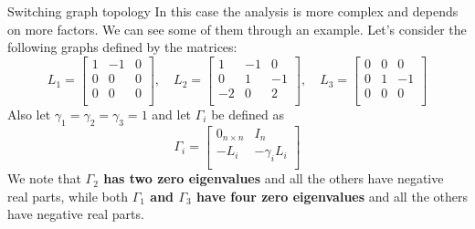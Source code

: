 \begin{frame}{Switching graph topology}
\vskip 0.9cm
In this case the analysis is more complex and depends on more factors.
We can see some of them through an example.
Let's consider the following graphs defined by the matrices:
$$
L_1 = \begin{bmatrix}
	  	1  &  -1  &  0 \\[0.3em]
		0  &  0  &  0  \\[0.3em]
		0  &  0  &  0  \\
	  \end{bmatrix}, \quad
L_2 = \begin{bmatrix}
	  	1  &  -1  &  0 \\[0.3em]
		0  &  1  &  -1  \\[0.3em]
		-2  &  0  &  2  \\
	  \end{bmatrix}, \quad
L_3 = \begin{bmatrix}
	  	0  &  0  &  0 \\[0.3em]
		0  &  1  &  -1  \\[0.3em]
		0  &  0  &  0  \\
	  \end{bmatrix}
$$
Also let $\gamma_1 = \gamma_2 = \gamma_3 = 1$ and let $\Gamma_i$ be defined as
$$
\Gamma_i = \begin{bmatrix}
	  	0_{n \times n}  &  I_n \\[0.3em]
		- L_i  &  - \gamma_i L_i \\
	  	\end{bmatrix}
$$
We note that  {\textcolor{green!40!black}{\fontsize{13}{15}\textbf{$\Gamma_2$ has two zero eigenvalues}}} 
and all the others have negative real parts,
while both  {\textcolor{green!40!black}{\fontsize{13}{15}\textbf{$\Gamma_1$ and $\Gamma_3$ have four zero eigenvalues}}} 
and all the others have negative real parts.
\end{frame}

